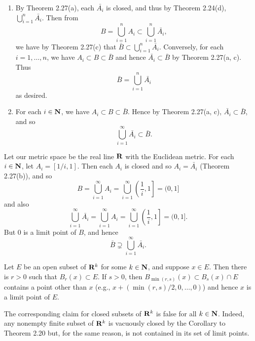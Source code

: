 \begin{ex}
\begin{enumerate}
\item By Theorem 2.27(a), each $\bar{A_i}$ is closed, and thus by Theorem 2.24(d), $\bigcup_{i = 1}^n\bar{A_i}$. Then from \[B = \bigcup_{i = 1}^nA_i \subset \bigcup_{i = 1}^n\bar{A_i},\] we have by Theorem 2.27(c) that $\bar{B} \subset \bigcup_{i = 1}^n\bar{A_i}$. Conversely, for each $i = 1, \ldots, n$, we have $A_i \subset B \subset \bar{B}$ and hence $\bar{A_i} \subset \bar{B}$ by Theorem 2.27(a, c). Thus \[\bar{B} = \bigcup_{i = 1}^n\bar{A_i}\] as desired.

\item For each $i \in \mathbf{N}$, we have $A_i \subset B \subset \bar{B}$. Hence by Theorem 2.27(a, c), $\bar{A_i} \subset \bar{B}$, and so \[\bigcup_{i = 1}^{\infty}\bar{A_i} \subset \bar{B}.\]
\end{enumerate}
Let our metric space be the real line $\mathbf{R}$ with the Euclidean metric. For each $i \in \mathbf{N}$, let $A_i = [1/i, 1]$. Then each $A_i$ is closed and so $A_i = \bar{A_i}$ (Theorem 2.27(b)), and so \[B = \bigcup_{i = 1}^{\infty}A_i = \bigcup_{i = 1}^{\infty}\left(\frac{1}{i}, 1\right] = (0, 1]\] and also \[\bigcup_{i = 1}^{\infty}\bar{A_i} = \bigcup_{i = 1}^{\infty}A_i = \bigcup_{i = 1}^{\infty}\left(\frac{1}{i}, 1\right] = (0, 1].\] But 0 is a limit point of $B$, and hence \[\bar{B} \supsetneq \bigcup_{i = 1}^{\infty}\bar{A_i}.\]
\end{ex}

\begin{ex}
Let $E$ be an open subset of $\mathbf{R}^k$ for some $k \in \mathbf{N}$, and suppose $x \in E$. Then there is $r > 0$ such that $B_r(x) \subset E$. If $s > 0$, then $B_{\min(r, s)}(x) \subset B_s(x)\cap E$ contains a point other than $x$ (e.g., $x + (\min(r, s)/2, 0, \ldots, 0)$) and hence $x$ is a limit point of $E$.

The corresponding claim for closed subsets of $\mathbf{R}^k$ is false for all $k \in \mathbf{N}$. Indeed, any nonempty finite subset of $\mathbf{R}^k$ is vacuously closed by the Corollary to Theorem 2.20 but, for the same reason, is not contained in its set of limit points.
\end{ex}

